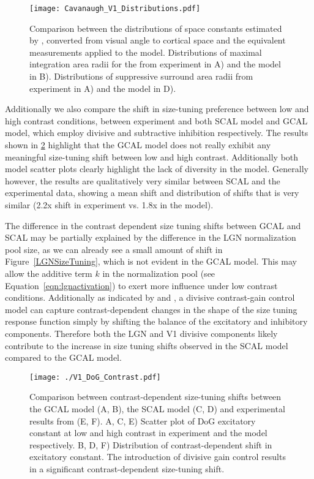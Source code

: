 \begin{figure}
	\centering
        \texttt{[image: Cavanaugh\_V1\_Distributions.pdf]}
	\caption[Distribution of V1 Difference-of-Gaussian space constants
      measured by \cite{Cavanaugh2002} compared to SCAL
      model.]{Comparison between the distributions of space constants
      estimated by \cite{Cavanaugh2002}, converted from visual angle
      to cortical space and the equivalent measurements applied to the
      model. Distributions of maximal integration area radii for the
      from experiment in A) and the model in B). Distributions of
      suppressive surround area radii from experiment in A) and the
      model in D).}
	\label{CavanaughDistribution}
\end{figure}

Additionally we also compare the shift in size-tuning preference
between low and high contrast conditions, between experiment
\citep{Sceniak1999} and both SCAL model and GCAL model, which employ
divisive and subtractive inhibition respectively. The results shown in
\ref{ContrastShift} highlight that the GCAL model does not really
exhibit any meaningful size-tuning shift between low and high
contrast. Additionally both model scatter plots clearly highlight the
lack of diversity in the model. Generally however, the results are
qualitatively very similar between SCAL and the experimental data,
showing a mean shift and distribution of shifts that is very similar
(2.2x shift in experiment vs. 1.8x in the model).

The difference in the contrast dependent size tuning shifts between
GCAL and SCAL may be partially explained by the difference in the LGN
normalization pool size, as we can already see a small amount of shift
in Figure~\ref{LGNSizeTuning}, which is not evident in the GCAL
model. This may allow the additive term $k$ in the normalization pool
(see Equation~\ref{eqn:lgnactivation}) to exert more influence under
low contrast conditions. Additionally as indicated by
\cite{Cavanaugh2002} and \citep{Solomon2006}, a divisive contrast-gain
control model can capture contrast-dependent changes in the shape of
the size tuning response function simply by shifting the balance of
the excitatory and inhibitory components. Therefore both the LGN and
V1 divisive components likely contribute to the increase in size
tuning shifts observed in the SCAL model compared to the GCAL model.

\begin{figure}
	\centering
        \texttt{[image: ./V1\_DoG\_Contrast.pdf]}
	\caption[Contrast-dependent size-tuning shifts compared between
      GCAL, SCAL and experimental results from
      \cite{Sceniak1999}.]{Comparison between contrast-dependent
      size-tuning shifts between the GCAL model (A, B), the SCAL model
      (C, D) and experimental results from \cite{Sceniak1999} (E,
      F). A, C, E) Scatter plot of DoG excitatory constant at low and
      high contrast in experiment and the model respectively. B, D, F)
      Distribution of contrast-dependent shift in excitatory
      constant. The introduction of divisive gain control results in a
      significant contrast-dependent size-tuning shift.}
	\label{ContrastShift}
\end{figure}

